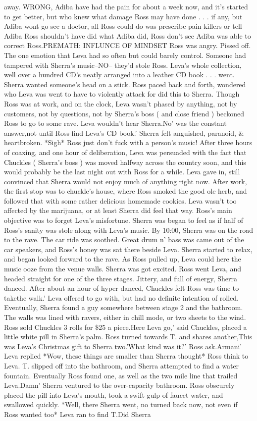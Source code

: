\documentclass[12pt]{book}
\begin{document}
away. WRONG, Adiba have had the pain for about a week now, and it's started to get better, but who knew what damage Ross may have done . . .  if any, but Adiba wont go see a doctor, all Ross could do was prescribe pain killers or tell Adiba Ross shouldn't have did what Adiba did, Ross don't see Adiba was able to correct Ross.PREMATH: INFLUNCE OF MINDSET Ross was angry. Pissed off. The one emotion that Leva had so often but could barely control. Someone had tampered with Sherra's music--NO-- they'd stole Ross. Leva's whole collection, well over a hundred CD's neatly arranged into a leather CD book . . .  went. Sherra wanted someone's head on a stick. Ross paced back and forth, wondered who Leva was went to have to violently attack for did this to Sherra. Though Ross was at work, and on the clock, Leva wasn't phased by anything, not by customers, not by questions, not by Sherra's boss ( and close friend ) beckoned Ross to go to some rave. Leva wouldn't hear Sherra.No' was the constant answer,not until Ross find Leva's CD book.' Sherra felt anguished, paranoid, \& heartbroken. *Sigh* Ross just don't fuck with a person's music! After three hours of coaxing, and one hour of deliberation, Leva was persuaded with the fact that Chuckles ( Sherra's boss ) was moved halfway across the country soon, and this would probably be the last night out with Ross for a while. Leva gave in, still convinced that Sherra would not enjoy much of anything right now. After work, the first stop was to chuckle's house, where Ross smoked the good ole herb, and followed that with some rather delicious homemade cookies. Leva wasn't too affected by the marijuana, or at least Sherra did feel that way. Ross's main objective was to forget Leva's misfortune. Sherra was began to feel as if half of Ross's sanity was stole along with Leva's music. By 10:00, Sherra was on the road to the rave. The car ride was soothed. Great drum n' bass was came out of the car speakers, and Ross's honey was sat there beside Leva. Sherra started to relax, and began looked forward to the rave. As Ross pulled up, Leva could here the music ooze from the venue walls. Sherra was got excited. Ross went Leva, and headed straight for one of the three stages. Jittery, and full of energy, Sherra danced. After about an hour of hyper danced, Chuckles felt Ross was time to takethe walk.' Leva offered to go with, but had no definite intention of rolled. Eventually, Sherra found a guy somewhere between stage 2 and the bathroom. The walls was lined with ravers, either in chill mode, or two sheets to the wind. Ross sold Chuckles 3 rolls for \$25 a piece.Here Leva go,' said Chuckles, placed a little white pill in Sherra's palm. Ross turned towards T. and shares another,This was Leva's Christmas gift to Sherra two.'What kind was it?' Ross ask.Armani' Leva replied *Wow, these things are smaller than Sherra thought* Ross think to Leva. T. slipped off into the bathroom, and Sherra attempted to find a water fountain. Eventually Ross found one, as well as the two mile line that trailed Leva.Damn' Sherra ventured to the over-capacity bathroom. Ross obscurely placed the pill into Leva's mouth, took a swift gulp of faucet water, and swallowed quickly. *Well, there Sherra went, no turned back now, not even if Ross wanted too* Leva ran to find T.Did Sherra 
\end{document}
